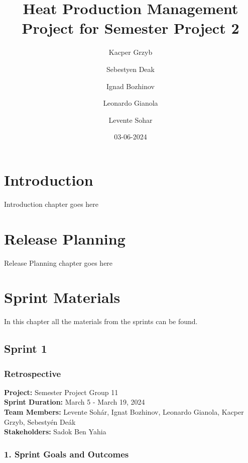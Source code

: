 \documentclass[12pt]{report}
\title{Heat Production Management Project for Semester Project 2}
\author{Kacper Grzyb \and Sebestyen Deak \and Ignad Bozhinov \and Leonardo Gianola \and Levente Sohar}
\date{03-06-2024}
\begin{document}
\maketitle

\tableofcontents

\chapter{Introduction}
Introduction chapter goes here

\chapter{Release Planning}
Release Planning chapter goes here

\chapter{Sprint Materials}
In this chapter all the materials from the sprints can be found.




\section{Sprint 1}

\subsection{Retrospective}
\textbf{Project:} Semester Project Group 11 \\
\textbf{Sprint Duration:} March 5 - March 19, 2024 \\
\textbf{Team Members:} Levente Sohár, Ignat Bozhinov, Leonardo Gianola, Kacper Grzyb, Sebestyén Deák \\
\textbf{Stakeholders:} Sadok Ben Yahia

\subsection*{1. Sprint Goals and Outcomes}
\end{document}
